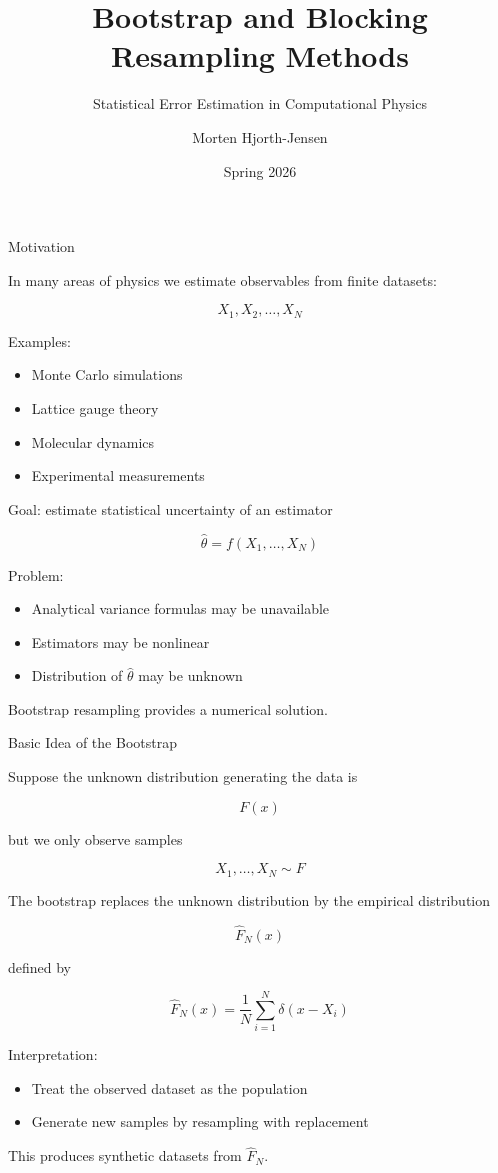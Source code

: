 \documentclass{beamer}
\title{Bootstrap and Blocking Resampling Methods}
\subtitle{Statistical Error Estimation in Computational Physics}
\author{Morten Hjorth-Jensen}
\date{Spring 2026}
\begin{document}
\frame{\titlepage}


\begin{frame}{Motivation}

In many areas of physics we estimate observables from finite datasets:

\[
X_1, X_2, \dots, X_N
\]

Examples:

\begin{itemize}
\item Monte Carlo simulations
\item Lattice gauge theory
\item Molecular dynamics
\item Experimental measurements
\end{itemize}

Goal: estimate statistical uncertainty of an estimator

\[
\hat{\theta} = f(X_1,\dots,X_N)
\]

Problem:

\begin{itemize}
\item Analytical variance formulas may be unavailable
\item Estimators may be nonlinear
\item Distribution of $\hat{\theta}$ may be unknown
\end{itemize}

Bootstrap resampling provides a numerical solution.
\end{frame}


\begin{frame}{Basic Idea of the Bootstrap}

Suppose the unknown distribution generating the data is

\[
F(x)
\]

but we only observe samples

\[
X_1,\dots,X_N \sim F
\]

The bootstrap replaces the unknown distribution by the empirical distribution

\[
\hat{F}_N(x)
\]

defined by

\[
\hat{F}_N(x)=\frac{1}{N}\sum_{i=1}^{N}\delta(x-X_i)
\]

Interpretation:

\begin{itemize}
\item Treat the observed dataset as the population
\item Generate new samples by resampling with replacement
\end{itemize}

This produces synthetic datasets from $\hat{F}_N$.
\end{frame}
\end{document}
